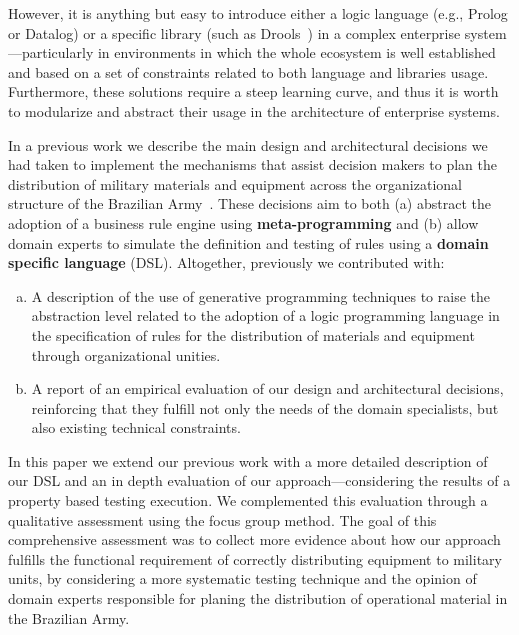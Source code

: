 \documentclass[AMA,STIX1COL]{WileyNJD-v2}
\begin{document}
However, it is anything but easy to introduce either a logic language (e.g., Prolog or Datalog) or a specific library (such as Drools~\cite{browne2009}) in a complex enterprise system---particularly in environments in which the whole ecosystem is well established and based on a set of constraints related to both language and libraries usage. Furthermore, these solutions require a steep learning curve, and thus it is worth to modularize and abstract their usage in the architecture of enterprise systems.

In a previous work we describe the main design and architectural decisions we had taken to implement the mechanisms that assist decision makers to plan the distribution of military materials and equipment across the organizational structure of the Brazilian Army~\cite{phtcosta:sbcars}. These decisions aim to both (a) abstract the adoption of a business rule engine using {\bf meta-programming} and (b) allow domain experts to simulate the definition and testing of rules using a {\bf domain specific language} (DSL). Altogether, previously we contributed with:

\begin{enumerate}[(a)] 

\item A description of the use of generative programming techniques to raise the abstraction level related to the adoption of a logic programming language in the specification of rules for the 	distribution of materials and equipment through organizational unities.

\item A report of an empirical evaluation of our design and architectural decisions, reinforcing that they fulfill not only the needs of the domain specialists, but also existing technical constraints. 	

\end{enumerate}


In this paper we extend our previous work with a more detailed description of our DSL and an in depth evaluation of our approach---considering the results of a property based testing execution. We complemented this evaluation through a qualitative assessment using the focus group method. The goal of this comprehensive assessment was to collect more evidence about how our approach fulfills the functional requirement of correctly distributing equipment to military units, by considering a more systematic testing technique and the opinion of domain experts responsible for planing the distribution of operational material in the Brazilian Army. 
\end{document}
